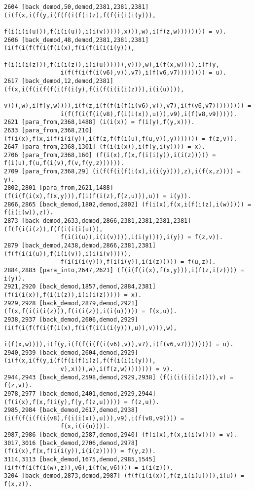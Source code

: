 {\begin{verbatim}
2604 [back_demod,50,demod,2381,2381,2381] (i(f(x,i(f(y,i(f(f(i(f(i(z),f(f(i(i(i(y))),
                f(i(i(i(u))),f(i(i(u)),i(i(v))))),x))),w),i(f(z,w)))))))) = v).
2606 [back_demod,48,demod,2381,2381,2381] (i(f(i(f(f(i(f(i(x),f(i(f(i(i(i(y))),
                f(i(i(i(z))),f(i(i(z)),i(i(u)))))),v))),w),i(f(x,w)))),i(f(y,
                i(f(f(i(f(i(v6),v)),v7),i(f(v6,v7)))))))) = u).
2617 [back_demod,12,demod,2381] (f(x,i(f(i(f(f(i(f(i(y),f(i(f(i(i(i(z))),i(i(u)))),
                v))),w),i(f(y,w)))),i(f(z,i(f(f(i(f(i(v6),v)),v7),i(f(v6,v7))))))))) = 
                i(f(f(i(f(i(v8),f(i(i(x)),u))),v9),i(f(v8,v9))))).
2621 [para_from,2368,1488] (i(i(x)) = f(i(y),f(y,x))).
2633 [para_from,2368,210] (f(i(x),f(x,i(f(i(i(y)),i(f(z,f(f(i(u),f(u,v)),y))))))) = f(z,v)).
2647 [para_from,2368,1301] (f(i(i(x)),i(f(y,i(y)))) = x).
2706 [para_from,2368,160] (f(i(x),f(x,f(i(i(y)),i(i(z))))) = f(i(u),f(u,f(i(v),f(v,f(y,z)))))).
2709 [para_from,2368,29] (i(f(f(i(f(i(x),i(i(y)))),z),i(f(x,z)))) = y).
2802,2801 [para_from,2621,1488] (f(i(f(i(x),f(x,y))),f(i(f(i(z),f(z,u))),u)) = i(y)).
2866,2865 [back_demod,1802,demod,2802] (f(i(x),f(x,i(f(i(z),i(w))))) = f(i(i(w)),z)).
2873 [back_demod,2633,demod,2866,2381,2381,2381,2381] (f(f(i(i(z)),f(f(i(i(i(u))),
                f(i(i(u)),i(i(v)))),i(i(y)))),i(y)) = f(z,v)).
2879 [back_demod,2438,demod,2866,2381,2381] (f(f(i(i(u)),f(i(i(v)),i(i(i(v))))),
                f(i(i(i(y))),f(i(i(y)),i(i(z))))) = f(u,z)).
2884,2883 [para_into,2647,2621] (f(i(f(i(x),f(x,y))),i(f(z,i(z)))) = i(y)).
2921,2920 [back_demod,1857,demod,2884,2381] (f(i(i(x)),f(i(i(z)),i(i(i(z))))) = x).
2929,2928 [back_demod,2879,demod,2921] (f(x,f(i(i(i(z))),f(i(i(z)),i(i(u))))) = f(x,u)).
2938,2937 [back_demod,2606,demod,2929] (i(f(i(f(f(i(f(i(x),f(i(f(i(i(i(y))),u)),v))),w),
                i(f(x,w)))),i(f(y,i(f(f(i(f(i(v6),v)),v7),i(f(v6,v7)))))))) = u).
2940,2939 [back_demod,2604,demod,2929] (i(f(x,i(f(y,i(f(f(i(f(i(z),f(f(i(i(i(y))),
                v),x))),w),i(f(z,w)))))))) = v).
2944,2943 [back_demod,2598,demod,2929,2938] (f(i(i(i(i(z)))),v) = f(z,v)).
2978,2977 [back_demod,2401,demod,2929,2944] (f(i(x),f(x,f(i(y),f(y,f(z,u))))) = f(z,u)).
2985,2984 [back_demod,2617,demod,2938] (i(f(f(i(f(i(v8),f(i(i(x)),u))),v9),i(f(v8,v9)))) = 
                f(x,i(i(u)))).
2987,2986 [back_demod,2587,demod,2940] (f(i(x),f(x,i(i(v)))) = v).
3017,3016 [back_demod,2706,demod,2978] (f(i(x),f(x,f(i(i(y)),i(i(z))))) = f(y,z)).
3114,3113 [back_demod,1675,demod,2985,1545] (i(f(f(i(f(i(w),z)),v6),i(f(w,v6)))) = i(i(z))).
3204 [back_demod,2873,demod,2987] (f(f(i(i(x)),f(z,i(i(u)))),i(u)) = f(x,z)).

\end{verbatim}}
